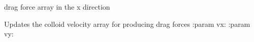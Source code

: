\documentclass[letterpaper,10pt,english]{sphinxmanual}
\begin{document}
\begin{fulllineitems}
\begin{fulllineitems}
\label{\detokenize{index:lb_colloids.Colloids.Colloid_Math.Drag.drag_x}}
 \textendash{} drag force array in the x direction

\end{fulllineitems}


\begin{fulllineitems}
\label{\detokenize{index:lb_colloids.Colloids.Colloid_Math.Drag.update}}
Updates the colloid velocity array for producing drag forces
:param vx:
:param vy:

\end{fulllineitems}


\end{fulllineitems}

\end{document}
